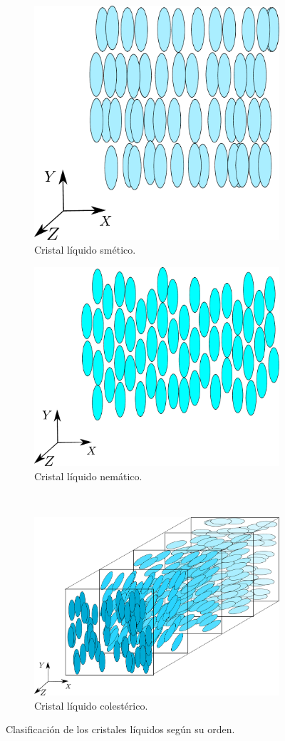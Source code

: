 \begin{figure}[h!]
\centering
\begin{subfigure}{.4\textwidth}
  \centering
  \includegraphics[width=.6\linewidth]{Smetic_LC}
  \caption{Cristal líquido smético.}
  \label{fig:smetic}
\end{subfigure}\qquad
\begin{subfigure}{.4\textwidth}
  \centering
  \includegraphics[width=.6\linewidth]{Nematic_LC}
  \caption{Cristal líquido nemático.}
  \label{fig:nematic}
\end{subfigure}\\
\begin{subfigure}{.5\textwidth}
  \centering
  \includegraphics[width=.6\linewidth]{Cholesteric_LC_2}
  \caption{Cristal líquido colestérico.}
  \label{fig:cholesteric}
\end{subfigure}
\caption{Clasificación de los cristales líquidos según su orden.}
\label{fig:CL_clasificacion}
\end{figure}


